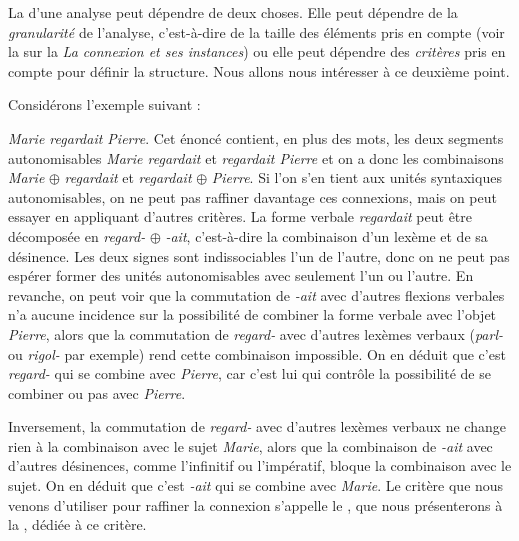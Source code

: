 {La  d'une analyse peut dépendre de deux choses. Elle peut dépendre de la \textit{granularité} de l'analyse, c'est-à-dire de la taille des éléments pris en compte (voir la  sur la \textit{La connexion et ses instances}) ou elle peut dépendre des \textit{critères} pris en compte pour définir la structure. Nous allons nous intéresser à ce deuxième point.

Considérons l’exemple suivant :

\ea \textit{Marie regardait Pierre}.\label{ex:regardait}
\z
Cet énoncé contient, en plus des mots, les deux segments autonomisables \textit{Marie regardait} et \textit{regardait Pierre} et on a donc les combinaisons \textit{Marie} ${\oplus}$ \textit{regardait} et \textit{regardait} ${\oplus}$ \textit{Pierre}. Si l’on s’en tient aux unités syntaxiques autonomisables, on ne peut pas raffiner davantage ces connexions, mais on peut essayer en appliquant d’autres critères. La forme verbale \textit{regardait} peut être décomposée en \textit{regard-} ${\oplus}$ \textit{{}-ait}, c’est-à-dire la combinaison d'un lexème et de sa désinence. Les deux signes sont indissociables l’un de l’autre, donc on ne peut pas espérer former des unités autonomisables avec seulement l’un ou l’autre. En revanche, on peut voir que la commutation de \textit{{}-ait} avec d’autres flexions verbales n’a aucune incidence sur la possibilité de combiner la forme verbale avec l’objet \textit{Pierre}, alors que la commutation de \textit{regard-} avec d’autres lexèmes verbaux (\textit{parl-} ou \textit{rigol-} par exemple) rend cette combinaison impossible. On en déduit que c’est \textit{regard-} qui se combine avec \textit{Pierre}, car c’est lui qui contrôle la possibilité de se combiner ou pas avec \textit{Pierre}. 

Inversement, la commutation de \textit{regard-} avec d’autres lexèmes verbaux ne change rien à la combinaison avec le sujet \textit{Marie}, alors que la combinaison de \textit{{}-ait} avec d’autres désinences, comme l’infinitif ou l’impératif, bloque la combinaison avec le sujet. On en déduit que c’est \textit{{}-ait} qui se combine avec \textit{Marie}. Le critère que nous venons d’utiliser pour raffiner la connexion s’appelle le , que nous présenterons à la , dédiée à ce critère.

}
